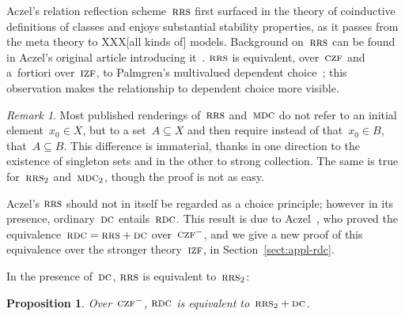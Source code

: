 \documentclass[oneside,reqno]{amsart}
\theoremstyle{definition}
\theoremstyle{plain}
\newtheorem{prop}[defn]{Proposition}
\theoremstyle{remark}
\newtheorem{rem}[defn]{Remark}
\renewcommand{\_}{\mathpunct{.}\,}
\newcommand{\?}{\,{:}\,}
\newcommand{\IZF}{\textsc{izf}}
\newcommand{\CZF}{\textsc{czf}}
\newcommand{\RRS}{\textsc{rrs}}
\newcommand{\RDC}{\textsc{rdc}}
\newcommand{\DC}{\textsc{dc}}
\newcommand{\MDC}{\textsc{mdc}}
\begin{document}
Aczel's relation reflection scheme~$\RRS$ first surfaced in
the theory of coinductive definitions of classes and enjoys substantial
stability properties, as it passes from the meta theory to XXX[all kinds of]
models. Background on~$\RRS$ can be found in Aczel's original article
introducing it~\cite{aczel:rrs}. $\RRS$ is equivalent, over~$\CZF$ and
a~fortiori over~$\IZF$, to Palmgren's multivalued dependent
choice~\cite{palmgren:mdc}; this observation makes the relationship to
dependent choice more visible.

\begin{rem}Most published renderings of~$\RRS$ and~$\MDC$ do not refer to an initial
element~$x_0 \in X$, but to a set~$A \subseteq X$ and then require instead
of that~$x_0 \in B$, that~$A \subseteq B$. This difference is immaterial, thanks in
one direction to the existence of singleton sets and in the other to strong
collection. The same is true for~$\RRS_2$ and~$\MDC_2$, though the proof is not
as easy.
\end{rem}

%
%
%
%
%

Aczel's $\RRS$ should not in itself be regarded as a choice principle; however in
its presence, ordinary~$\DC$ entails~$\RDC$. This result is due to
Aczel~\cite[Theorem~2.4]{aczel:rrs}, who proved the equivalence~$\RDC = \RRS +
\DC$ over~$\CZF^-$, and we give a new proof of this equivalence over the
stronger theory~$\IZF$, in Section~\ref{sect:appl-rdc}.

In the presence of~$\DC$, $\RRS$ is equivalent to~$\RRS_2$:

\begin{prop}\label{prop:rdc-rrs2-dc}
Over~$\CZF^-$, $\RDC$ is equivalent to~$\RRS_2 + \DC$.
\end{prop}
\end{document}
